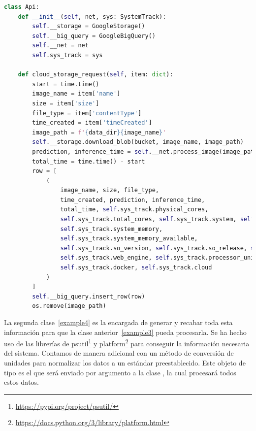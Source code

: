 \begin{lstlisting}[caption=Clase Python para la API de la aplicación.
      label=c_label,
      language=Python,label={example3}]
    class Api:
    def __init__(self, net, sys: SystemTrack):
        self.__storage = GoogleStorage()
        self.__big_query = GoogleBigQuery()
        self.__net = net
        self.sys_track = sys

    def cloud_storage_request(self, item: dict):
        start = time.time()
        image_name = item['name']
        size = item['size']
        file_type = item['contentType']
        time_created = item['timeCreated']
        image_path = f'{data_dir}{image_name}'
        self.__storage.download_blob(bucket, image_name, image_path)
        prediction, inference_time = self.__net.process_image(image_path)
        total_time = time.time() - start
        row = [
            (
                image_name, size, file_type,
                time_created, prediction, inference_time,
                total_time, self.sys_track.physical_cores,
                self.sys_track.total_cores, self.sys_track.system, self.sys_track.processor,
                self.sys_track.system_memory,
                self.sys_track.system_memory_available,
                self.sys_track.so_version, self.sys_track.so_release, self.sys_track.inference_engine,
                self.sys_track.web_engine, self.sys_track.processor_unit,
                self.sys_track.docker, self.sys_track.cloud
            )
        ]
        self.__big_query.insert_row(row)
        os.remove(image_path)
\end{lstlisting}
La segunda clase~\ref{example4} es la encargada de generar y recabar toda esta información para que la clase anterior~\ref{example3} pueda procesarla.
Se ha hecho uso de las librerías de psutil\footnote{\url{https://pypi.org/project/psutil/}} y platform\footnote{\url{https://docs.python.org/3/library/platform.html}} para conseguir la información necesaria del sistema.
Contamos de manera adicional con un método de conversión de unidades para normalizar los datos a un estándar preestablecido.
Este objeto de tipo  es el que será enviado por argumento a la clase , la cual procesará todos estos datos.
